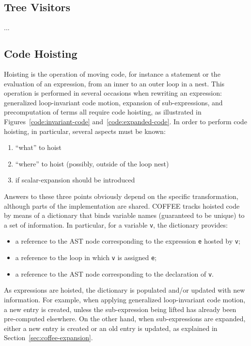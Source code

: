 
\subsection{Tree Visitors}
...

\subsection{Code Hoisting}
Hoisting is the operation of moving code, for instance a statement or the evaluation of an expression, from an inner to an outer loop in a nest. This operation is performed in several occasions when rewriting an expression: generalized loop-invariant code motion, expansion of sub-expressions, and precomputation of terms all require code hoisting, as illustrated in Figures~\ref{code:invariant-code} and~\ref{code:expanded-code}. In order to perform code hoisting, in particular, several aspects must be known:
\begin{enumerate}
\item ``what'' to hoist
\item ``where'' to hoist (possibly, outside of the loop nest)
\item if scalar-expansion should be introduced
\end{enumerate}
Answers to these three points obviously depend on the specific transformation, although parts of the implementation are shared. COFFEE tracks hoisted code by means of a dictionary that binds variable names (guaranteed to be unique) to a set of information. In particular, for a variable \texttt{v}, the dictionary provides:
\begin{itemize}
\item a reference to the AST node corresponding to the expression \texttt{e} hosted by \texttt{v};
\item a reference to the loop in which \texttt{v} is assigned \texttt{e};
\item a reference to the AST node corresponding to the declaration of \texttt{v}.
\end{itemize}
As expressions are hoisted, the dictionary is populated and/or updated with new information. For example, when applying generalized loop-invariant code motion, a new entry is created, unless the sub-expression being lifted has already been pre-computed elsewhere. On the other hand, when sub-expressions are expanded, either a new entry is created or an old entry is updated, as explained in Section~\ref{sec:coffee-expansion}. 

